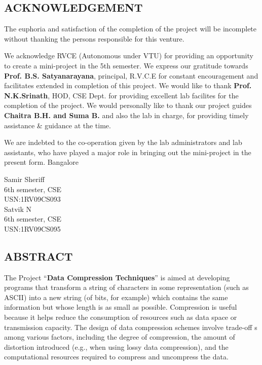 \documentclass[12pt]{report}
\begin{document}
  
\setcounter{page}{1}
\begin{center}
\section*{ACKNOWLEDGEMENT}
\end{center}
The euphoria and satisfaction of the completion of the project will be incomplete
without thanking the persons responsible for this venture.


We acknowledge RVCE (Autonomous under VTU) for providing an opportunity to
create a mini-project in the 5th semester. We express our gratitude towards \textbf{Prof. B.S.
Satyanarayana}, principal, R.V.C.E for constant encouragement and facilitates extended
in completion of this project. We would like to thank \textbf{Prof. N.K.Srinath}, HOD, CSE
Dept. for providing excellent lab facilites for the completion of the project. We would
personally like to thank our project guides \textbf{Chaitra B.H. and Suma B.} and also the lab in charge, for providing timely assistance \& guidance at the time.



We are indebted to the co-operation given by the lab administrators and lab assistants,
who have played a major role in bringing out the mini-project in the present form.
Bangalore



\begin{flushright}
Samir Sheriff\\
6th semester, CSE\\
USN:1RV09CS093\\

Satvik N\\
6th semester, CSE\\
USN:1RV09CS095\\

\end{flushright}

\newpage

\begin{center}
\section*{ABSTRACT}
\end{center} 
The Project ``\textbf{Data Compression Techniques}” is aimed at developing programs that transform a string of characters in some representation (such as ASCII) into a new string (of bits, for example) which contains the same information but whose length is as small as possible.  Compression is useful because it helps reduce the consumption of resources such as data space or transmission capacity. The design of data compression schemes involve trade-off s among various factors, including the degree of compression, the amount of distortion introduced (e.g., when using lossy data compression), and the computational resources required to compress and uncompress the data.
 
\end{document}
